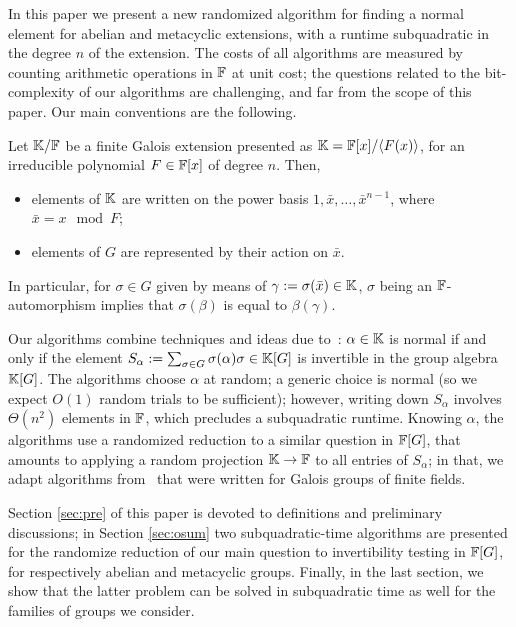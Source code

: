 In this paper we present a new randomized algorithm for finding a
normal element for abelian and metacyclic extensions, with a runtime
subquadratic in the degree $n$ of the extension. The costs of all
algorithms are measured by counting arithmetic operations in $\mathbb{F}$ at
unit cost; the questions related to the bit-complexity of our
algorithms are challenging, and far from the scope of this paper.  Our
main conventions are the following.
\begin{assumption}
  \label{assum}
  Let $\mathbb{K}/\mathbb{F}$ be a finite Galois extension presented as
  $\mathbb{K}=\mathbb{F}[x]/\langle F(x)\rangle$, for an irreducible polynomial $F\in
  \mathbb{F}[x]$ of degree $n$. Then,
  \begin{itemize}
  \item elements of $\mathbb{K}$ are written on the power basis $1,\bar x,\dots,\bar x^{n-1}$,
    where $\bar x = x \mod F$;
  \item elements of $G$ are represented by their action on $\bar x$.
  \end{itemize}
\end{assumption}
In particular, for $\sigma \in G$ given by means of
$\gamma:=\sigma(\bar x) \in \mathbb{K}$, $\sigma$ being an $\mathbb{F}$-automorphism
implies that $\sigma(\beta)$ is equal to $\beta(\gamma)$.

Our algorithms combine techniques and ideas due
to~\cite{Giesbrecht,Kaltofen}: $\alpha \in \mathbb{K}$ is normal if and only
if the element $S_\alpha := \sum_{\sigma \in G} \sigma(\alpha)\sigma
\in \mathbb{K}[G]$ is invertible in the group algebra $\mathbb{K}[G]$. The algorithms
choose $\alpha$ at random; a generic choice is normal (so we expect
$O(1)$ random trials to be sufficient); however, writing down
$S_\alpha$ involves $\Theta(n^2)$ elements in $\mathbb{F}$, which precludes a
subquadratic runtime. Knowing $\alpha$, the algorithms use a
randomized reduction to a similar question in $\mathbb{F}[G]$, that amounts to
applying a random projection $\mathbb{K}\to\mathbb{F}$ to all entries of $S_\alpha$;
in that, we adapt algorithms from~\cite{Kaltofen} that were written
for Galois groups of finite fields.


Section \ref{sec:pre} of this paper is devoted to definitions and
preliminary discussions; in Section \ref{sec:osum} two
subquadratic-time algorithms are presented for the randomize reduction
of our main question to invertibility testing in $\mathbb{F}[G]$, for
respectively abelian and metacyclic groups.  Finally, in the last
section, we show that the latter problem can be solved in subquadratic
time as well for the families of groups we consider.

